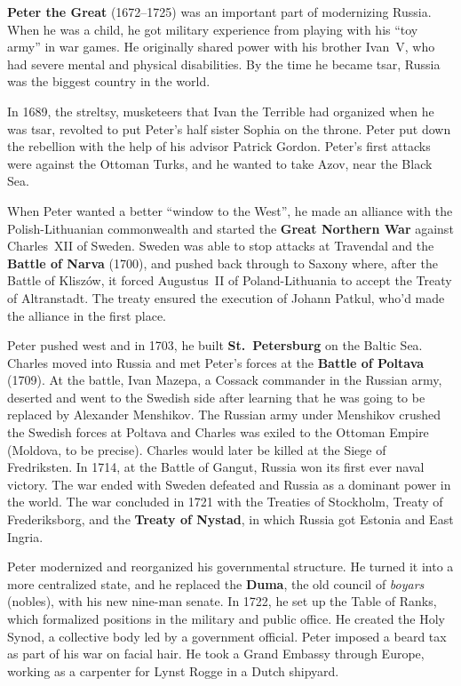 \textbf{Peter the Great} (1672--1725) was an important part of modernizing Russia.
When he was a child, he got military experience from playing with his ``toy army'' in war games.
He originally shared power with his brother Ivan~V, who had severe mental and physical disabilities.
By the time he became tsar, Russia was the biggest country in the world.

In 1689, the streltsy, musketeers that Ivan the Terrible had organized when he was tsar,
revolted to put Peter's half sister Sophia on the throne.
Peter put down the rebellion with the help of his advisor Patrick Gordon.
Peter's first attacks were against the Ottoman Turks, and he wanted to take Azov, near the Black Sea.

When Peter wanted a better ``window to the West'',
he made an alliance with the Polish-Lithuanian commonwealth
and started the \textbf{Great Northern War} against Charles~XII of Sweden.
Sweden was able to stop attacks at Travendal and the \textbf{Battle of Narva} (1700),
and pushed back through to Saxony where, after the Battle of Klisz\'ow,
it forced Augustus~II of Poland-Lithuania to accept the Treaty of Altranstadt.
The treaty ensured the execution of Johann Patkul, who'd made the alliance in the first place.

Peter pushed west and in 1703, he built \textbf{St.\ Petersburg} on the Baltic Sea.
Charles moved into Russia and met Peter's forces at the \textbf{Battle of Poltava} (1709).
At the battle, Ivan Mazepa, a Cossack commander in the Russian army,
deserted and went to the Swedish side after learning that he was going to be replaced by Alexander Menshikov.
The Russian army under Menshikov crushed the Swedish forces at Poltava
and Charles was exiled to the Ottoman Empire (Moldova, to be precise).
Charles would later be killed at the Siege of Fredriksten.
In 1714, at the Battle of Gangut, Russia won its first ever naval victory.
The war ended with Sweden defeated and Russia as a dominant power in the world.
The war concluded in 1721 with the Treaties of Stockholm, Treaty of Frederiksborg,
and the \textbf{Treaty of Nystad}, in which Russia got Estonia and East Ingria.

Peter modernized and reorganized his governmental structure.
He turned it into a more centralized state, and he replaced the \textbf{Duma},
the old council of \textit{boyars} (nobles), with his new nine-man senate.
In 1722, he set up the Table of Ranks, which formalized positions in the military and public office.
He created the Holy Synod, a collective body led by a government official.
Peter imposed a beard tax as part of his war on facial hair.
He took a Grand Embassy through Europe, working as a carpenter for Lynst Rogge in a Dutch shipyard.

